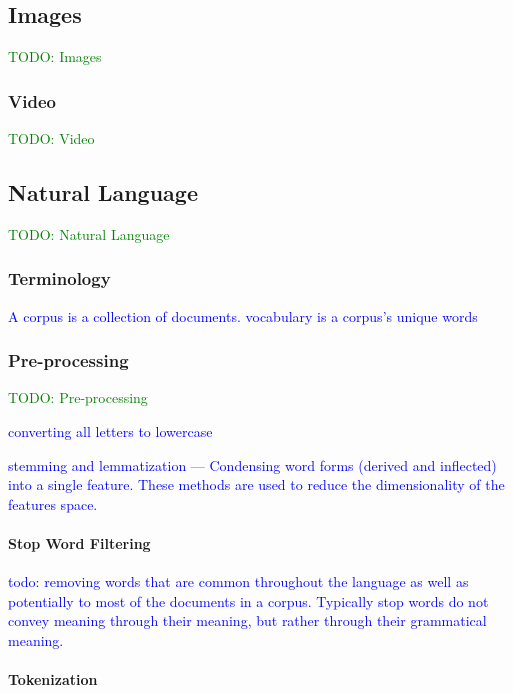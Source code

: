 \subsection{Images}

\textcolor{green}{TODO: Images}


\subsubsection{Video}

\textcolor{green}{TODO: Video}


\subsection{Natural Language}

\textcolor{green}{TODO: Natural Language}

\subsubsection{Terminology}

\textcolor{blue}{A {corpus} is a collection of documents. {vocabulary} is a corpus's unique words}

\subsubsection{Pre-processing}

\textcolor{green}{TODO: Pre-processing}

\textcolor{blue}{converting all letters to lowercase}

\textcolor{blue}{stemming and lemmatization --- Condensing word forms (derived and inflected) into a single feature. These methods are used to reduce the dimensionality of the features space.}

\paragraph{Stop Word Filtering}

\textcolor{blue}{todo: removing words that are common throughout the language as well as potentially to most of the documents in a corpus. Typically stop words do not convey meaning through their meaning, but rather through their grammatical meaning.}

\paragraph{Tokenization}

